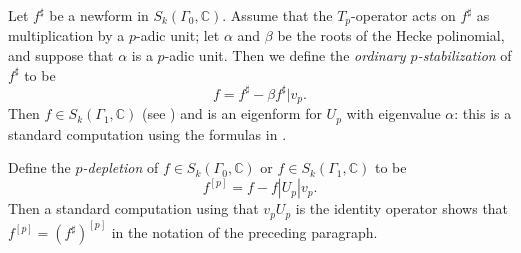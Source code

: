 \documentclass[a4paper,11pt]{amsart}
\numberwithin{equation}{section}
\theoremstyle{plain}
\theoremstyle{definition}
\theoremstyle{remark}
\newcommand{\C}{\mathbb{C}}
\newcommand{\smallmat}[4]{\bigl(\begin{smallmatrix}#1&#2\\#3&#4\end{smallmatrix}\bigr)}
\begin{document}
Let $f^\sharp$ be a newform in $S_k(\Gamma_0,\C)$.
Assume that the $T_p$-operator acts on $f^\sharp$ as multiplication by a $p$-adic unit; let $\alpha$ and $\beta$ be the roots of the Hecke polinomial, and suppose that $\alpha$ is a $p$-adic unit. Then we define the \emph{ordinary $p$-stabilization} of $f^\sharp$ to be \[f=f^\sharp-\beta f^\sharp|v_p.\] Then $f\in S_k(\Gamma_1,\C)$ (see \cite[\S2.1]{Hijikata}) and is an eigenform for $U_p$ with eigenvalue $\alpha$: this is a standard computation using the formulas in \cite[\S2.4]{Hijikata}.

Define the \emph{$p$-depletion} of $f\in S_k(\Gamma_0,\C)$ or $f\in S_k(\Gamma_1,\C)$ to be 
\[f^{[p]}=f-f|U_p|v_p.\] Then a standard computation using that $v_pU_p$ is the identity operator shows that $f^{[p]}=(f^\sharp)^{[p]}$ in the notation of the preceding paragraph.
\end{document}
